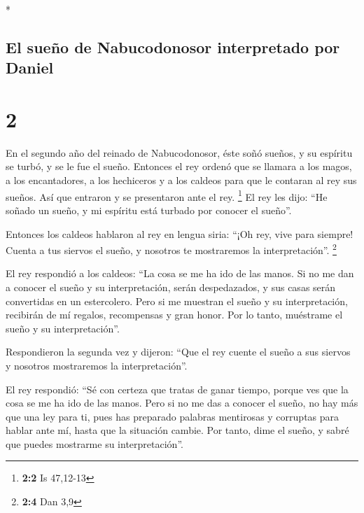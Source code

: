 \begin{paracol}{2}
\begin{otherlanguage}{english}
\end{otherlanguage}

\switchcolumn[0]*

\hypertarget{el-sueuxf1o-de-nabucodonosor-interpretado-por-daniel}{%
\subsection{El sueño de Nabucodonosor interpretado por
Daniel}\label{el-sueuxf1o-de-nabucodonosor-interpretado-por-daniel}}

\hypertarget{section-2}{%
\section{2}\label{section-2}}

 En el segundo año del reinado de Nabucodonosor, éste soñó
sueños, y su espíritu se turbó, y se le fue el sueño. 
Entonces el rey ordenó que se llamara a los magos, a los encantadores, a
los hechiceros y a los caldeos para que le contaran al rey sus sueños.
Así que entraron y se presentaron ante el rey. \footnote{\textbf{2:2} Is
  47,12-13}  El rey les dijo: ``He soñado un sueño, y mi
espíritu está turbado por conocer el sueño''.

 Entonces los caldeos hablaron al rey en lengua siria:
``¡Oh rey, vive para siempre! Cuenta a tus siervos el sueño, y nosotros
te mostraremos la interpretación''. \footnote{\textbf{2:4} Dan 3,9}

 El rey respondió a los caldeos: ``La cosa se me ha ido de
las manos. Si no me dan a conocer el sueño y su interpretación, serán
despedazados, y sus casas serán convertidas en un estercolero.
 Pero si me muestran el sueño y su interpretación,
recibirán de mí regalos, recompensas y gran honor. Por lo tanto,
muéstrame el sueño y su interpretación''.

 Respondieron la segunda vez y dijeron: ``Que el rey
cuente el sueño a sus siervos y nosotros mostraremos la
interpretación''.

 El rey respondió: ``Sé con certeza que tratas de ganar
tiempo, porque ves que la cosa se me ha ido de las manos. 
Pero si no me das a conocer el sueño, no hay más que una ley para ti,
pues has preparado palabras mentirosas y corruptas para hablar ante mí,
hasta que la situación cambie. Por tanto, dime el sueño, y sabré que
puedes mostrarme su interpretación''.


\end{paracol}
